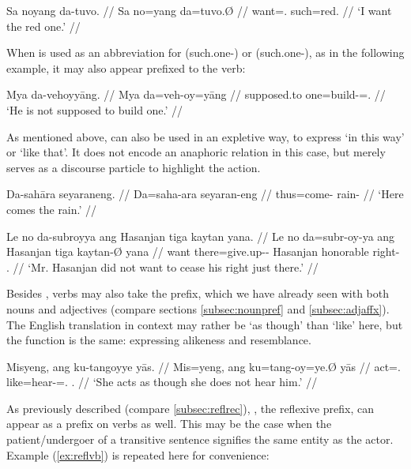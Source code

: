 \ex\begingl
	\gla Sa noyang da-tuvo. //
	\glb Sa no=yang da=tuvo.Ø //
	\glc \PatT{} want=\Fsg{}.\Aarg{} such=red.\Top{} //
	\glft `I want the red one.' //
\endgl\xe

When  is used as an abbreviation for  
(such.one-\Parg{}) or  (such.one-\PargI{}), as in the 
following example, it may also appear prefixed to the verb:

\ex\begingl
	\gla Mya da-vehoyyāng. //
	\glb Mya da=veh-oy=yāng //
	\glc supposed.to one=build-\Neg{}=\Tsg.\M{} //
	\glft `He is not supposed to build one.' //
\endgl\xe

As mentioned above,  can also be used in an expletive way, to 
express `in this way' or `like that'. It does not encode an anaphoric relation 
in this case, but merely serves as a discourse particle to highlight the action.

\pex
\a\begingl
	\gla Da-sahāra seyaraneng. //
	\glb Da=saha-ara seyaran-eng //
	\glc thus=come-\TsgI{} rain-\AargI{} //
	\glft `Here comes the rain.' //
\endgl

\a\begingl
	\gla Le no da-subroyya ang Hasanjan tiga kaytan yana. //
	\glb Le no da=subr-oy-ya ang Hasanjan tiga kaytan-Ø yana //
	\glc \PatT{} want there=give.up-\Neg{}-\TsgM{} \Aarg{} Hasanjan 
		honorable right-\Top{} \TsgM{}.\Gen{} //
	\glft `Mr. Hasanjan did not want to cease his right just there.' //
\endgl

\xe

Besides , verbs may also take the  prefix, 
which we have already seen with both nouns and adjectives (compare sections 
\ref{subsec:nounpref} and \ref{subsec:adjaffx}). The English translation in 
context may rather be `as though' than `like' here, but the function is the 
same: expressing alikeness and resemblance.

\ex\begingl
	\gla Misyeng, ang ku-tangoyye yās. //
	\glb Mis=yeng, ang ku=tang-oy=ye.Ø yās //
	\glc act=\TsgF{}.\Aarg{} \AgtT{} like=hear-\Neg{}=\TsgF{}.\Top{} 
		\TsgM{}.\Parg{} //
	\glft `She acts as though she does not hear him.' //
\endgl\xe

As previously described (compare \autoref{subsec:reflrec}), 
, the reflexive prefix, can appear as a prefix on 
verbs as well. This may be the case when the patient/undergoer of a 
transitive sentence signifies the same entity as the actor. Example 
(\ref{ex:reflvb}) is repeated here for convenience:

